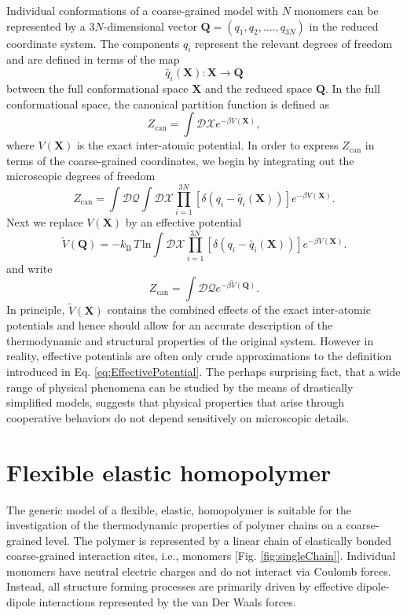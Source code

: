 \documentclass[12pt]{report}
\begin{document}
Individual conformations of a coarse-grained model with $N$ monomers can be represented by a $3N$-dimensional vector $\mathbf{Q} = (q_{1},q_{2},....,q_{3N})$ in the reduced coordinate system. The components $q_{i}$ represent the relevant degrees of freedom and are defined in terms of the map 
%
\begin{equation}
\tilde{q_{i}}(\textbf{X}): \textbf{X} \rightarrow \textbf{Q} 
\end{equation}
%
between the full conformational space $\mathbf{X}$ and the reduced space $\mathbf{Q}$. In the full conformational space, the canonical partition function is defined as
%
\begin{equation}
Z_{\mathrm{can}} = \int \mathcal{DX}e^{-\beta V(\mathbf{X})},
\end{equation}
%
where $V(\mathbf{X})$ is the exact inter-atomic potential. In order to express $Z_{\mathrm{can}}$ in terms of the coarse-grained coordinates, we begin by integrating out the microscopic degrees of freedom
%
\begin{equation}
Z_{\mathrm{can}} = \int \mathcal{DQ}\int \mathcal{DX}\prod _{i = 1}^{3N} \left[\delta (q_{i} - \tilde{q_{i}}(\mathbf{X}))\right]e^{-\beta V(\mathbf{X})}.
\end{equation}
Next we replace $V(\mathbf{X})$ by an effective potential
%
\begin{equation}
\label{eq:EffectivePotential}
\tilde{V}(\mathbf{Q}) = -k_{\mathrm{B}}\,T\,\mathrm{ln} \int \mathcal{DX}\prod_{i = 1}^{3N} \left[\delta (q_{i} - \tilde{q_{i}}(\mathbf{X}))\right]e^{-\beta V(\mathbf{X})}.
\end{equation}
%
and write
%
\begin{equation}
Z_{\mathrm{can}} = \int \mathcal{DQ}e^{-\beta \tilde{V}(\mathbf{Q})}.
\end{equation}
%
In principle, $\tilde{V}(\mathbf{X})$ contains the combined effects of the exact inter-atomic potentials and hence should allow for an accurate description of the thermodynamic and structural properties of the original system. However in reality, effective potentials are often only crude approximations to the definition introduced in Eq. \ref{eq:EffectivePotential}. The perhaps surprising fact, that a wide range of physical phenomena can be studied by the means of drastically simplified models, suggests that physical properties that arise through cooperative behaviors do not depend sensitively on microscopic details.

\newpage

\section{Flexible elastic homopolymer}
The generic model of a flexible, elastic, homopolymer is suitable for the investigation of the thermodynamic properties of polymer chains on a coarse-grained level. The polymer is represented by a linear chain of elastically bonded coarse-grained interaction sites, i.e., monomers [Fig.\,\,\ref{fig:singleChain}]. Individual monomers have neutral electric charges and do not interact via Coulomb forces. Instead, all structure forming processes are primarily driven by effective dipole-dipole interactions represented by the van Der Waals forces. 
\end{document}
